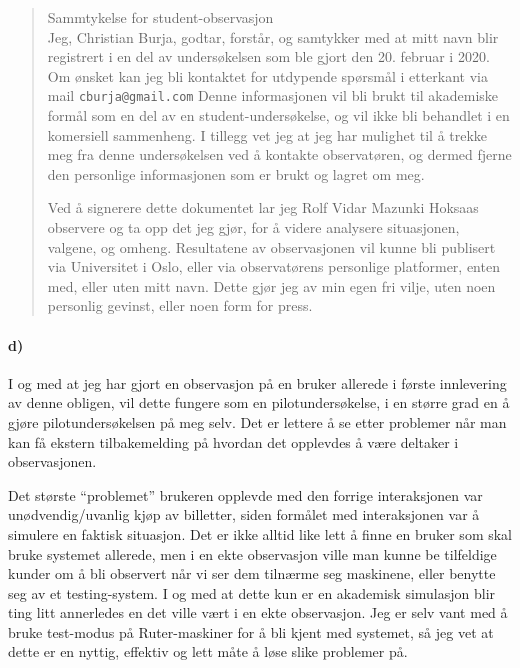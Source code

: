 \documentclass{../../myassignment}
\begin{document}
	\begin{quote}
		Sammtykelse for student-observasjon\\

		Jeg, Christian Burja, godtar, forst{\aa}r, og samtykker med at mitt navn blir registrert i en del av unders{\o}kelsen som ble gjort den 20. februar i 2020. Om ønsket kan jeg bli kontaktet for utdypende spørsmål i etterkant via mail \texttt{cburja@gmail.com} Denne informasjonen vil bli brukt til akademiske form{\aa}l som en del av en student-unders{\o}kelse, og vil ikke bli behandlet i en komersiell sammenheng. I tillegg vet jeg at jeg har mulighet til å trekke meg fra denne undersøkelsen ved å kontakte observatøren, og dermed fjerne den personlige informasjonen som er brukt og lagret om meg. 

		Ved {\aa} signerere dette dokumentet lar jeg Rolf Vidar Mazunki Hoksaas observere og ta opp det jeg gj{\o}r, for {\aa} videre analysere situasjonen, valgene, og omheng. Resultatene av observasjonen vil kunne bli publisert via Universitet i Oslo, eller via observatørens personlige platformer, enten med, eller uten mitt navn. Dette gj{\o}r jeg av min egen fri vilje, uten noen personlig gevinst, eller noen form for press. 



	\end{quote}


	\paragraph*{d)}
	I og med at jeg har gjort en observasjon på en bruker allerede i første innlevering av denne obligen, vil dette fungere som en pilotundersøkelse, i en større grad en å gjøre pilotundersøkelsen på meg selv. Det er lettere å se etter problemer når man kan få ekstern tilbakemelding på hvordan det opplevdes å være deltaker i observasjonen. 

	Det største ``problemet'' brukeren opplevde med den forrige interaksjonen var unødvendig/uvanlig kjøp av billetter, siden formålet med interaksjonen var å simulere en faktisk situasjon. Det er ikke alltid like lett å finne en bruker som skal bruke systemet allerede, men i en ekte observasjon ville man kunne be tilfeldige kunder om å bli observert når vi ser dem tilnærme seg maskinene, eller benytte seg av et testing-system. I og med at dette kun er en akademisk simulasjon blir ting litt annerledes en det ville vært i en ekte observasjon. Jeg er selv vant med å bruke test-modus på Ruter-maskiner for å bli kjent med systemet, så jeg vet at dette er en nyttig, effektiv og lett måte å løse slike problemer på. 
\end{document}
